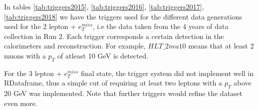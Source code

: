 In tables \ref{tab:triggers2015}, \ref{tab:triggers2016}, \ref{tab:triggers2017}, \ref{tab:triggers2018} we have the triggers used for
the different data generations used for the 2 lepton + $e_T^{miss}$, i.e the data taken from the 4 years of data collection in Run 2. 
Each trigger corresponds a certain detection in the calorimeters and reconstruction. For example, $HLT\_2mu10$ means that at least 2 muons 
with a $p_T$ of atleast 10 GeV is detected. \par 
For the 3 lepton + $e_T^{miss}$ final state, the trigger system did not implement well in RDataframe, thus a simple cut of requiring 
at least two leptons with a $p_T$ above 20 GeV was implemented. Note that further triggers would refine the dataset even more. 


\newpage





